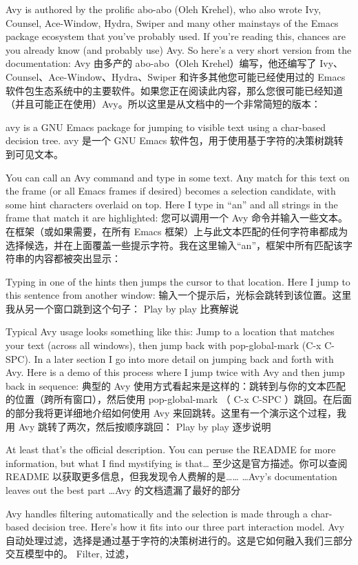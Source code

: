 \documentclass[lang=cn,color=blue]{elegantbook}
\begin{document}
Avy is authored by the prolific abo-abo (Oleh Krehel), who also wrote Ivy, Counsel, Ace-Window, Hydra, Swiper and many other mainstays of the Emacs package ecosystem that you’ve probably used. If you’re reading this, chances are you already know (and probably use) Avy. So here’s a very short version from the documentation:
Avy 由多产的 abo-abo（Oleh Krehel）编写，他还编写了 Ivy、Counsel、Ace-Window、Hydra、Swiper 和许多其他您可能已经使用过的 Emacs 软件包生态系统中的主要软件。如果您正在阅读此内容，那么您很可能已经知道（并且可能正在使用）Avy。所以这里是从文档中的一个非常简短的版本：

avy is a GNU Emacs package for jumping to visible text using a char-based decision tree.
avy 是一个 GNU Emacs 软件包，用于使用基于字符的决策树跳转到可见文本。

You can call an Avy command and type in some text. Any match for this text on the frame (or all Emacs frames if desired) becomes a selection candidate, with some hint characters overlaid on top. Here I type in “an” and all strings in the frame that match it are highlighted:
您可以调用一个 Avy 命令并输入一些文本。在框架（或如果需要，在所有 Emacs 框架）上与此文本匹配的任何字符串都成为选择候选，并在上面覆盖一些提示字符。我在这里输入“an”，框架中所有匹配该字符串的内容都被突出显示：

Typing in one of the hints then jumps the cursor to that location. Here I jump to this sentence from another window:
输入一个提示后，光标会跳转到该位置。这里我从另一个窗口跳到这个句子：
Play by play  比赛解说

Typical Avy usage looks something like this: Jump to a location that matches your text (across all windows), then jump back with pop-global-mark (C-x C-SPC). In a later section I go into more detail on jumping back and forth with Avy. Here is a demo of this process where I jump twice with Avy and then jump back in sequence:
典型的 Avy 使用方式看起来是这样的：跳转到与你的文本匹配的位置（跨所有窗口），然后使用 pop-global-mark （ C-x C-SPC ）跳回。在后面的部分我将更详细地介绍如何使用 Avy 来回跳转。这里有一个演示这个过程，我用 Avy 跳转了两次，然后按顺序跳回：
Play by play  逐步说明

At least that’s the official description. You can peruse the README for more information, but what I find mystifying is that…
至少这是官方描述。你可以查阅 README 以获取更多信息，但我发现令人费解的是……
…Avy’s documentation leaves out the best part
…Avy 的文档遗漏了最好的部分

Avy handles filtering automatically and the selection is made through a char-based decision tree. Here’s how it fits into our three part interaction model.
Avy 自动处理过滤，选择是通过基于字符的决策树进行的。这是它如何融入我们三部分交互模型中的。
Filter,  过滤，
\end{document}
